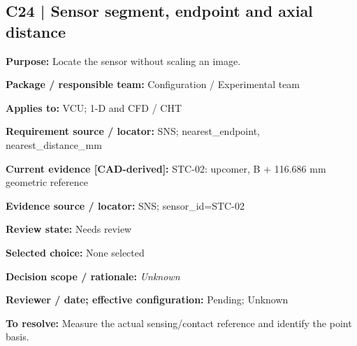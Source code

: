 \documentclass[11pt]{article}
\begin{document}
\par\noindent\begin{minipage}{\textwidth}\small\setlength{\parskip}{2pt}
\subsection*{C24 | Sensor segment, endpoint and axial distance}
\textbf{Purpose:} Locate the sensor without scaling an image.\par
\textbf{Package / responsible team:} Configuration / Experimental team\par
\textbf{Applies to:} VCU; 1-D and CFD / CHT\par
\textbf{Requirement source / locator:} SNS; nearest\_\allowbreak{}endpoint, nearest\_\allowbreak{}distance\_\allowbreak{}mm\par
\textbf{Current evidence [CAD-derived]:} STC-02: upcomer, B + 116.686 mm geometric reference\par
\textbf{Evidence source / locator:} SNS; sensor\_\allowbreak{}id=STC-02\par
\textbf{Review state:} Needs review\par
\textbf{Selected choice:} None selected\par
\textbf{Decision scope / rationale:} \textit{Unknown}\par
\textbf{Reviewer / date; effective configuration:} Pending; Unknown\par
\textbf{To resolve:} Measure the actual sensing/contact reference and identify the point basis.\par
\end{minipage}\par\vspace{5pt}
\end{document}
